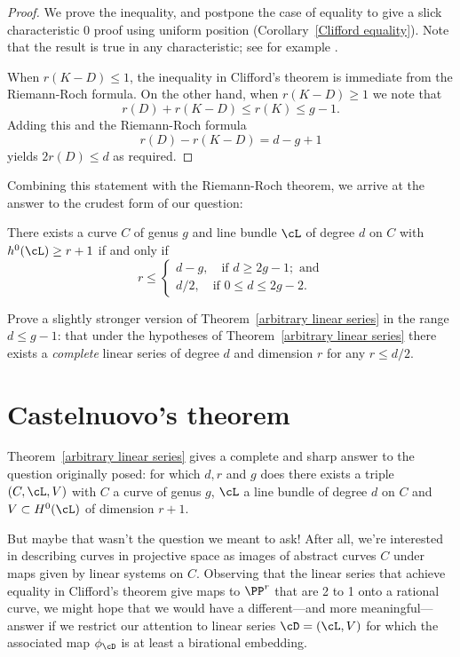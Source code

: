 \begin{proof} We prove the inequality, and  postpone the case of equality to give a slick characteristic 0 proof using  uniform position (Corollary~\ref{Clifford equality}). Note that the result is true in any characteristic; see for example \cite[Theorem ****]{Hartshorne1977}.

When $r(K-D)\leq 1$, the inequality in Clifford's theorem is immediate from the Riemann-Roch formula. On the other hand, when $r(K-D) \geq 1$ we note that
$$
 r(D)+r(K-D) \leq r(K) \leq g-1.
$$
Adding this and the Riemann-Roch formula
$$
r(D)-r(K-D) = d - g +1
$$
yields $2r(D)\leq d$ as required.

\end{proof}

Combining this statement with the Riemann-Roch theorem, we arrive at the answer to the crudest form of our question:

\begin{theorem}\label{arbitrary linear series}
There exists a curve $C$ of genus $g$ and line bundle $\cL$ of degree $d$ on $C$ with $h^0(\cL) \geq r+1$ if and only if
$$
r \leq
\begin{cases}
d-g, \quad \text{if } d \geq 2g-1; \text{ and} \\
d/2,  \quad \text{if } 0 \leq d \leq 2g-2.
\end{cases}
$$
\end{theorem}

\begin{exercise}
Prove a slightly stronger version of Theorem~\ref{arbitrary linear series} in the range $d \leq g-1$: that under the hypotheses of Theorem~\ref{arbitrary linear series} there exists a \emph{complete} linear series of degree $d$ and dimension $r$ for any $r \leq d/2$.
\end{exercise}

\section{Castelnuovo's theorem}

Theorem~\ref{arbitrary linear series} gives a complete and sharp answer to the question originally posed: for which $d,r$ and $g$ does there exists a triple $(C,\cL,V)$ with $C$ a curve of genus $g$, $\cL$ a line bundle of degree $d$ on $C$ and $V \subset H^0(\cL)$ of dimension $r+1$. 

But maybe that wasn't the question we meant to ask! After all, we're interested in describing curves in projective space as images of abstract curves $C$ under maps given by linear systems on $C$. Observing that the linear series that achieve equality in Clifford's theorem give maps to $\PP^r$ that are 2 to 1 onto a rational curve, we might hope that we would have a different---and more meaningful---answer if we  restrict our attention to linear series $\cD = (\cL,V)$ for which the associated map $\phi_\cD$ is at least a birational embedding. 

